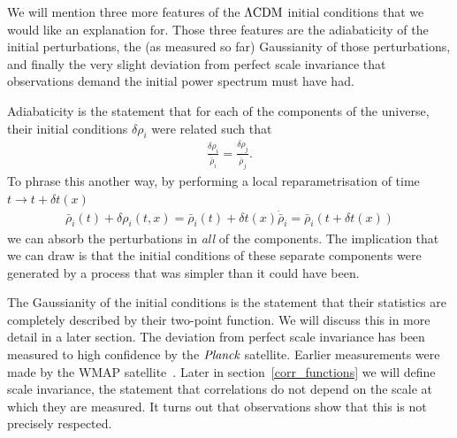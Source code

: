 

    We will mention three more features of the $\Lambda\text{CDM}$ initial conditions that we would
    like an explanation for. Those three features are the adiabaticity of the initial
    perturbations, the (as measured so far) Gaussianity of those perturbations, and finally
    the very slight deviation from perfect scale invariance that observations demand the
    initial power spectrum must have had.


    Adiabaticity is the statement that for each of the components of the universe, their
    initial conditions $\delta\rho_i$ were related such that
    \begin{align}
        \frac{\delta\rho_i}{\dot{\bar{\rho}}_i} = \frac{\delta\rho_j}{\dot{\bar{\rho}}_j}.
    \end{align}
    To phrase this another way, by performing a local reparametrisation of time $t\rightarrow t+\delta t(x)$
    \begin{align}
        \bar{\rho}_i(t)+\delta \rho_i(t,x) = \bar{\rho}_i(t)+\delta t(x)\dot{\bar{\rho}}_i
        = \bar{\rho}_i(t+\delta t(x))
    \end{align}
    we can absorb the perturbations in \textit{all} of the components. The implication that we can draw
    is that the initial conditions of these separate components were generated by a process that was simpler than
    it could have been.


    The Gaussianity of the initial conditions is the statement that their statistics are completely described by
    their two-point function. We will discuss this in more detail in a later section.
    The deviation from perfect scale invariance has been measured to high confidence by the $\textit{Planck}$
    satellite.
    Earlier measurements were made by the WMAP satellite~\cite{Senatore_wmap_2009}.
    Later in section~\ref{corr_functions} we will define scale invariance,
    the statement that correlations do not depend on the scale at which they are measured.
    It turns out that observations show that this is not precisely respected.


